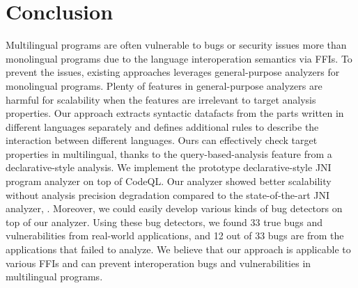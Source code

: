 \section{Conclusion}\label{sec:conclude}
Multilingual programs are often vulnerable to bugs or security issues
more than monolingual programs due to the language interoperation semantics
via FFIs.  To prevent the issues, existing approaches leverages general-purpose
analyzers for monolingual programs.  Plenty of features in general-purpose
analyzers are harmful for scalability when the features are irrelevant to target
analysis properties.  Our approach extracts syntactic datafacts from the
parts written in different languages separately and defines additional rules to
describe the interaction between different languages.  Ours can effectively
check target properties in multilingual, thanks to the query-based-analysis
feature from a declarative-style analysis.  We implement the prototype
declarative-style JNI program analyzer on top of CodeQL.  Our analyzer showed
better scalability without analysis precision degradation compared to the
state-of-the-art JNI analyzer, \lees.  Moreover, we could easily develop
various kinds of bug detectors on top of our analyzer.  Using these bug detectors,
we found 33 true bugs and vulnerabilities from real-world applications, and 12 out
of 33 bugs are from the applications that \lees failed to analyze.  We believe
that our approach is applicable to various FFIs and can prevent interoperation
bugs and vulnerabilities in multilingual programs.

